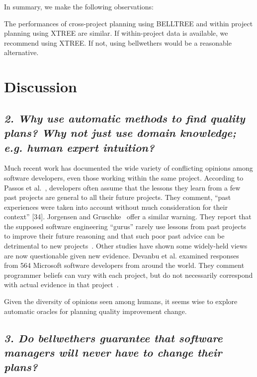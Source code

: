 \documentclass[10pt,journal,compsoc]{IEEEtran}
\begin{document}
In summary, we make the following observations:

\begin{lesson}
The performances of cross-project planning using BELLTREE and within project planning using XTREE are similar. If within-project data is available, we recommend using XTREE. If not, using bellwethers would be a reasonable alternative.\\[-0.2cm]
\end{lesson}

\section{Discussion}
\label{sect:discuss}
\subsection*{\textit{2. Why use automatic methods to find quality plans? Why not just use domain knowledge; e.g. human expert intuition?}}

Much recent work has documented the wide variety of conflicting
opinions among software developers, even those working within the same project. According to Passos et al.~\cite{passos11}, developers often assume that the lessons they learn from a few past projects are general to all their future projects. They comment, “past experiences were taken into account without
much consideration for their context” [34]. Jorgensen and Gruschke~\cite{jorgensen09} offer a similar warning. They report that the supposed software engineering ``gurus” rarely use lessons from past projects to improve their future reasoning and that such poor past advice can be detrimental to new projects~\cite{jorgensen09}. Other studies have shown some widely-held views are now questionable given new evidence. Devanbu et al. examined responses from 564 Microsoft software developers from around the world. They comment programmer beliefs can vary with
each project, but do not necessarily correspond with actual evidence
in that project~\cite{prem16}.

Given the diversity of opinions seen among humans, it seems wise to explore automatic oracles for planning quality improvement change.

\subsection*{\textit{3. Do bellwethers guarantee that software managers will never have to change their plans?}}
\end{document}
